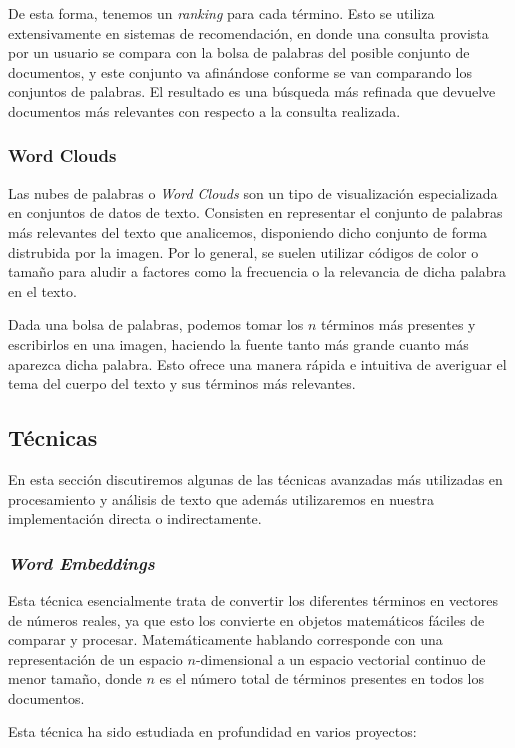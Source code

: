De esta forma, tenemos un \textit{ranking} para cada término. Esto se utiliza extensivamente en sistemas de recomendación, en donde una consulta provista por un usuario se compara con la bolsa de palabras del posible conjunto de documentos, y este conjunto va afinándose conforme se van comparando los conjuntos de palabras. El resultado es una búsqueda más refinada que devuelve documentos más relevantes con respecto a la consulta realizada.

\subsubsection{Word Clouds}
Las nubes de palabras o \textit{Word Clouds} son un tipo de visualización especializada en conjuntos de datos de texto. Consisten en representar el conjunto de palabras más relevantes del texto que analicemos, disponiendo dicho conjunto de forma distrubida por la imagen. Por lo general, se suelen utilizar códigos de color o tamaño para aludir a factores como la frecuencia o la relevancia de dicha palabra en el texto.

Dada una bolsa de palabras, podemos tomar los $n$ términos más presentes y escribirlos en una imagen, haciendo la fuente tanto más grande cuanto más aparezca dicha palabra. Esto ofrece una manera rápida e intuitiva de averiguar el tema del cuerpo del texto y sus términos más relevantes.


\subsection{Técnicas}
En esta sección discutiremos algunas de las técnicas avanzadas más utilizadas en procesamiento y análisis de texto que además utilizaremos en nuestra implementación directa o indirectamente.

\subsubsection{\textit{Word Embeddings}}
Esta técnica esencialmente trata de convertir los diferentes términos en vectores de números reales, ya que esto los convierte en objetos matemáticos fáciles de comparar y procesar. Matemáticamente hablando corresponde con una representación de un espacio $n$-dimensional a un espacio vectorial continuo de menor tamaño, donde $n$ es el número total de términos presentes en todos los documentos.

Esta técnica ha sido estudiada en profundidad en varios proyectos:

